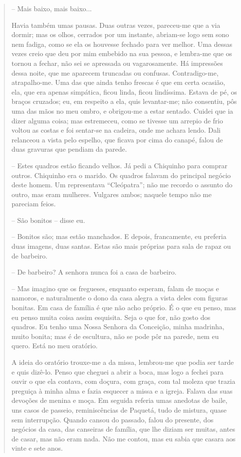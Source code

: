 \begin{quote}
-- Mais baixo, mais baixo...

Havia também umas pausas. Duas outras vezes, pareceu-me que a via
dormir; mas os olhos, cerrados por um instante, abriam-se logo sem sono
nem fadiga, como se ela os houvesse fechado para ver melhor. Uma dessas
vezes creio que deu por mim embebido na sua pessoa, e lembra-me que os
tornou a fechar, não sei se apressada ou vagarosamente. Há impressões
dessa noite, que me aparecem truncadas ou confusas. Contradigo-me,
atrapalho-me. Uma das que ainda tenho frescas é que em certa ocasião,
ela, que era apenas simpática, ficou linda, ficou lindíssima. Estava de
pé, os braços cruzados; eu, em respeito a ela, quis levantar-me; não
consentiu, pôs uma das mãos no meu ombro, e obrigou-me a estar sentado.
Cuidei que ia dizer alguma coisa; mas estremeceu, como se tivesse um
arrepio de frio voltou as costas e foi sentar-se na cadeira, onde me
achara lendo. Dali relanceou a vista pelo espelho, que ficava por cima
do canapé, falou de duas gravuras que pendiam da parede.

-- Estes quadros estão ficando velhos. Já pedi a Chiquinho para comprar
outros. Chiquinho era o marido. Os quadros falavam do principal negócio
deste homem. Um representava ``Cleópatra''; não me recordo o assunto do
outro, mas eram mulheres. Vulgares ambos; naquele tempo não me pareciam
feios.

-- São bonitos -- disse eu.

-- Bonitos são; mas estão manchados. E depois, francamente, eu preferia
duas imagens, duas santas. Estas são mais próprias para sala de rapaz ou
de barbeiro.

-- De barbeiro? A senhora nunca foi a casa de barbeiro.

-- Mas imagino que os fregueses, enquanto esperam, falam de moças e
namoros, e naturalmente o dono da casa alegra a vista deles com figuras
bonitas. Em casa de família é que não acho próprio. É o que eu penso,
mas eu penso muita coisa assim esquisita. Seja o que for, não gosto dos
quadros. Eu tenho uma Nossa Senhora da Conceição, minha madrinha, muito
bonita; mas é de escultura, não se pode pôr na parede, nem eu quero.
Está no meu oratório.

A ideia do oratório trouxe-me a da missa, lembrou-me que podia ser tarde
e quis dizê-lo. Penso que cheguei a abrir a boca, mas logo a fechei para
ouvir o que ela contava, com doçura, com graça, com tal moleza que
trazia preguiça à minha alma e fazia esquecer a missa e a igreja. Falava
das suas devoções de menina e moça. Em seguida referia umas anedotas de
baile, uns casos de passeio, reminiscências de Paquetá, tudo de mistura,
quase sem interrupção. Quando cansou do passado, falou do presente, dos
negócios da casa, das canseiras de família, que lhe diziam ser muitas,
antes de casar, mas não eram nada. Não me contou, mas eu sabia que
casara aos vinte e sete anos.


\end{quote}
